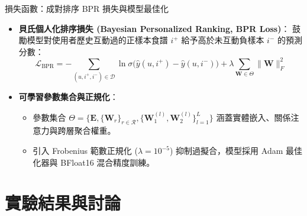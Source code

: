 \documentclass[aspectratio=169, 10pt]{beamer}
\begin{document}
\begin{frame}{損失函數：成對排序 BPR 損失與模型最佳化}
  \begin{itemize}
    \item \alert{\textbf{貝氏個人化排序損失 (Bayesian Personalized Ranking, BPR Loss)}}：
      鼓勵模型對使用者歷史互動過的正樣本食譜 $i^+$ 給予高於未互動負樣本 $i^-$ 的預測分數：
      \[
        \mathcal{L}_{\text{BPR}} = -\sum_{(u, i^+, i^-) \in \mathcal{D}} \ln \sigma\Big(\hat{y}(u, i^+) - \hat{y}(u, i^-)\Big) + \lambda \sum_{\mathbf{W} \in \Theta} \|\mathbf{W}\|_F^2
      \]
    \item \alert{\textbf{可學習參數集合與正規化}}：
      \begin{itemize}
        \item 參數集合 $\Theta = \{\mathbf{E}, \{\mathbf{W}_r\}_{r \in \mathcal{R}}, \{\mathbf{W}_1^{(l)}, \mathbf{W}_2^{(l)}\}_{l=1}^L\}$ 涵蓋實體嵌入、關係注意力與跨層聚合權重。
        \item 引入 Frobenius 範數正規化 ($\lambda = 10^{-5}$) 抑制過擬合，模型採用 Adam 最佳化器與 BFloat16 混合精度訓練。
      \end{itemize}
  \end{itemize}
\end{frame}

\section{實驗結果與討論}
\end{document}
